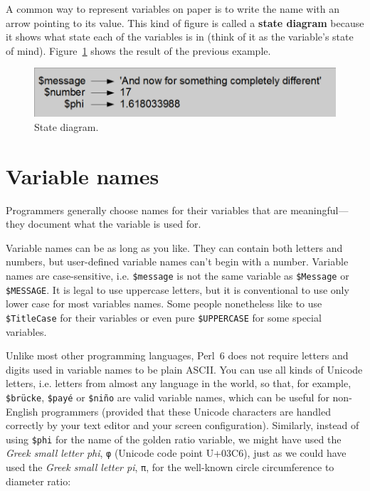 A common way to represent variables on paper is to write the name with
an arrow pointing to its value.  This kind of figure is
called a {\bf state diagram} because it shows what state each of the
variables is in (think of it as the variable's state of mind).
Figure~\ref{fig.state2} shows the result of the previous example.

\begin{figure}
\centerline
{\includegraphics[scale=0.6]{figs/test_5.png}}
\caption{State diagram.}
\label{fig.state2}
\end{figure}



\section{Variable names}

Programmers generally choose names for their variables that
are meaningful---they document what the variable is used for.

Variable names can be as long as you like.  They can contain
both letters and numbers, but user-defined variable names 
can't begin with a number. Variable names are case-sensitive, 
i.e. {\tt \$message} is not the same variable as {\tt \$Message} 
or {\tt \$MESSAGE}. It is legal to use uppercase letters, but 
it is conventional to use only lower case for most variables 
names. Some people nonetheless like to use {\tt \$TitleCase} 
for their variables or even pure {\tt \$UPPERCASE} for 
some special variables.

Unlike most other programming languages, Perl~6 does not require letters 
and digits used in variable names to be plain ASCII. 
You can use all kinds of Unicode letters, i.e. 
letters from almost any language in the world, so that, for example,  
{\tt \$brücke}, {\tt \$payé} or {\tt \$niño} are 
valid variable names, which can be useful for non-English 
programmers (provided that these Unicode characters are 
handled correctly by your text editor and your 
screen configuration). Similarly, instead of using 
\verb"$phi" for the name of the golden ratio variable, 
we might have used the \emph{Greek small letter phi}, \verb'φ' 
(Unicode code point U+03C6), just as we could have used 
the \emph{Greek small letter pi}, \verb'π',  for the well-known 
circle circumference to diameter ratio:

